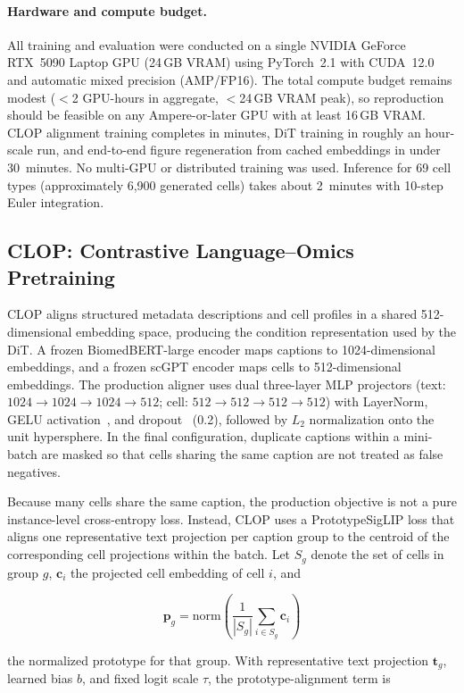 \documentclass[genes,article,submit,pdftex,oneauthor]{Definitions/mdpi}
\begin{document}
\paragraph{Hardware and compute budget.}
All training and evaluation were conducted on a single NVIDIA GeForce RTX~5090 Laptop GPU (24\,GB VRAM) using PyTorch~2.1 with CUDA~12.0 and automatic mixed precision (AMP/FP16). The total compute budget remains modest ($<$2 GPU-hours in aggregate, $<$24\,GB VRAM peak), so reproduction should be feasible on any Ampere-or-later GPU with at least 16\,GB VRAM. CLOP alignment training completes in minutes, DiT training in roughly an hour-scale run, and end-to-end figure regeneration from cached embeddings in under 30~minutes. No multi-GPU or distributed training was used. Inference for 69 cell types (approximately 6,900 generated cells) takes about 2~minutes with 10-step Euler integration.

\subsection{CLOP: Contrastive Language--Omics Pretraining}\label{sec:clop}

CLOP aligns structured metadata descriptions and cell profiles in a shared 512-dimensional embedding space, producing the condition representation used by the DiT. A frozen BiomedBERT-large encoder maps captions to 1024-dimensional embeddings, and a frozen scGPT encoder maps cells to 512-dimensional embeddings. The production aligner uses dual three-layer MLP projectors (text: $1024 \to 1024 \to 1024 \to 512$; cell: $512 \to 512 \to 512 \to 512$) with LayerNorm, GELU activation~\cite{ref-gelu}, and dropout~\cite{ref-dropout} (0.2), followed by $L_2$ normalization onto the unit hypersphere. In the final configuration, duplicate captions within a mini-batch are masked so that cells sharing the same caption are not treated as false negatives.

Because many cells share the same caption, the production objective is not a pure instance-level cross-entropy loss. Instead, CLOP uses a PrototypeSigLIP loss that aligns one representative text projection per caption group to the centroid of the corresponding cell projections within the batch. Let $S_g$ denote the set of cells in group $g$, $\mathbf{c}_i$ the projected cell embedding of cell $i$, and
\begin{linenomath}
\begin{equation}
\mathbf{p}_g = \mathrm{norm}\!\left(\frac{1}{|S_g|}\sum_{i \in S_g} \mathbf{c}_i\right)
\end{equation}
\end{linenomath}
the normalized prototype for that group. With representative text projection $\mathbf{t}_g$, learned bias $b$, and fixed logit scale $\tau$, the prototype-alignment term is
\end{document}

